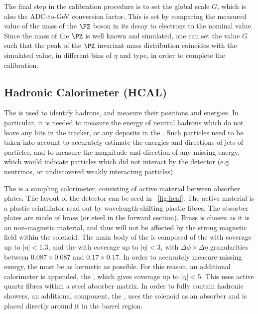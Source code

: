The final step in the calibration procedure is to set the global scale $G$, which is also the ADC-to-GeV conversion factor. This is set by comparing the measured value of the mass of the $\PZ$ boson in its decay to electrons to the nominal value. Since the mass of the $\PZ$ is well known and simulated, one can set the value $G$ such that the peak of the $\PZ$ invariant mass distribution coincides with the simulated value, in different bins of $\eta$ and \SC type, in order to complete the calibration.


\subsection{Hadronic Calorimeter (HCAL)}
\label{sec:cms:hcal}

The \HCAL is used to identify hadrons, and measure their positions and energies. In particular, it is needed to measure the energy of neutral hadrons which do not leave any hits in the tracker, or any deposits in the \ECAL. Such particles need to be taken into account to accurately estimate the energies and directions of jets of particles, and to measure the magnitude and direction of any missing energy, which would indicate particles which did not interact by the \CMS detector (e.g. neutrinos, or undiscovered weakly interacting particles). 

The \CMS \HCAL is a sampling calorimeter, consisting of active material between absorber plates. The layout of the detector can be seed in \Fig~\ref{fig:hcal}. The active material is a plastic scintillator read out by wavelength-shifting plastic fibres. The absorber plates are made of brass (or steel in the forward section). Brass is chosen as it is an non-magnetic material, and thus will not be affected by the strong magnetic field within the solenoid. The main body of the \HCAL is composed of the \HB with coverage up to $|\eta| < 1.3$, and the \HE with coverage up to $|\eta| < 3$, with $\Delta\phi \times \Delta\eta$ granularities between $0.087 \times 0.087$ and $ 0.17 \times 0.17$. In order to accurately measure missing energy, the \HCAL must be as hermetic as possible. For this reason, an additional calorimeter is appended, the \HF, which gives coverage up to $|\eta| <5$. This uses active quartz fibres within a steel absorber matrix. In order to fully contain hadronic showers, an additional component, the \HO, uses the solenoid as an absorber and is placed directly around it in the barrel region.~\cite{cmsHcal} 

